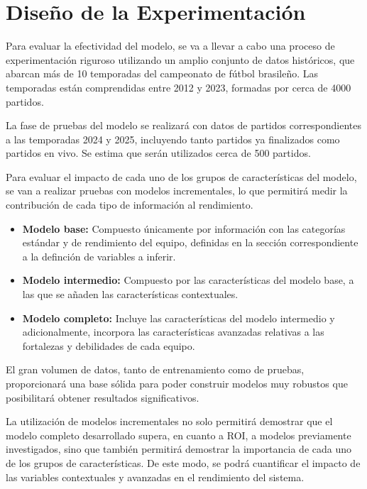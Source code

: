 \section{Diseño de la Experimentación}

Para evaluar la efectividad del modelo, se va a llevar a cabo una proceso de experimentación riguroso utilizando un amplio conjunto de datos históricos, que abarcan más de 10 temporadas del campeonato de fútbol brasileño. Las temporadas están comprendidas entre 2012 y 2023, formadas por cerca de 4000 partidos. 

La fase de pruebas del modelo se realizará con datos de partidos correspondientes a las temporadas 2024 y 2025, incluyendo tanto partidos ya finalizados como partidos en vivo. Se estima que serán utilizados cerca de 500 partidos.

Para evaluar el impacto de cada uno de los grupos de características del modelo, se van a realizar pruebas con modelos incrementales, lo que permitirá medir la contribución de cada tipo de información al rendimiento.

\begin{itemize}
    \item \textbf{Modelo base:} Compuesto únicamente por información con las categorías estándar y de rendimiento del equipo, definidas en la sección correspondiente a la definción de variables a inferir.
    \item \textbf{Modelo intermedio:} Compuesto por las características del modelo base, a las que se añaden las características contextuales.
    \item \textbf{Modelo completo:} Incluye las características del modelo intermedio y adicionalmente, incorpora las características avanzadas relativas a las fortalezas y debilidades de cada equipo.
\end{itemize}


El gran volumen de datos, tanto de entrenamiento como de pruebas, proporcionará una base sólida para poder construir modelos muy robustos que posibilitará obtener resultados significativos. 

La utilización de modelos incrementales no solo permitirá demostrar que el modelo completo desarrollado supera, en cuanto a ROI, a modelos previamente investigados, sino que también permitirá demostrar la importancia de cada uno de los grupos de características. De este modo, se podrá cuantificar el impacto de las variables contextuales y avanzadas en el rendimiento del sistema.